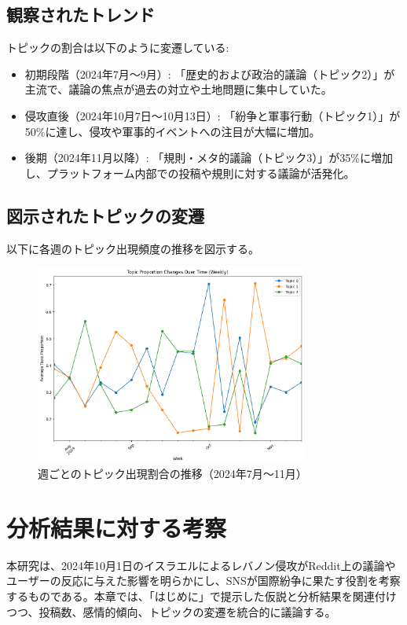 \documentclass[11pt, a4j]{jreport}
\begin{document}
    \subsection*{観察されたトレンド}
    トピックの割合は以下のように変遷している:
    \begin{itemize}
        \item 初期段階（2024年7月～9月）: 「歴史的および政治的議論（トピック2）」が主流で、議論の焦点が過去の対立や土地問題に集中していた。
        \item 侵攻直後（2024年10月7日～10月13日）: 「紛争と軍事行動（トピック1）」が50\%に達し、侵攻や軍事的イベントへの注目が大幅に増加。
        \item 後期（2024年11月以降）: 「規則・メタ的議論（トピック3）」が35\%に増加し、プラットフォーム内部での投稿や規則に対する議論が活発化。
    \end{itemize}

    \subsection*{図示されたトピックの変遷}
    以下に各週のトピック出現頻度の推移を図示する。

    \begin{figure}[H]
        \centering
        \includegraphics[width=0.8\textwidth]{topic_trends_plot.png}
        \caption{週ごとのトピック出現割合の推移（2024年7月～11月）}
        \label{fig:topic_trends}
    \end{figure}

    \section{分析結果に対する考察}

    本研究は、2024年10月1日のイスラエルによるレバノン侵攻がReddit上の議論やユーザーの反応に与えた影響を明らかにし、SNSが国際紛争に果たす役割を考察するものである。本章では、「はじめに」で提示した仮説と分析結果を関連付けつつ、投稿数、感情的傾向、トピックの変遷を統合的に議論する。
\end{document}
